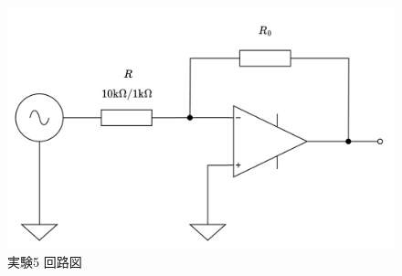 \begin{figure}
	\centering
	\includegraphics[width=0.6\linewidth]{src/figures/exp5/circuit.png}
	\caption{実験5 回路図}\label{fig:exp5-circuit}
\end{figure}
